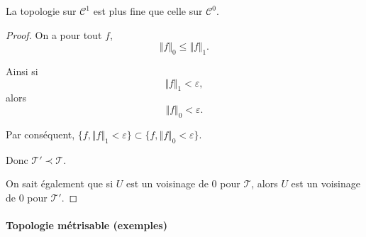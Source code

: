 \documentclass[french]{book}
\theoremstyle{definition}
\newcommand{\lesss}{<}
\newcommand{\less}{\lesss}
\begin{document}
La topologie sur $\mathcal{C}^1$ est plus fine que celle sur $\mathcal{C}^0$.

\begin{proof}
  On a pour tout $f$, $$\Vert f \Vert _{0} \leq \Vert f \Vert _{1} .$$

  Ainsi si $$\Vert f \Vert _{1} \less \varepsilon,   $$ alors $$\Vert f \Vert _{0} \less \varepsilon.  $$

  Par conséquent, $\{ f , \Vert f \Vert _{1 } \less \varepsilon  \} \subset \{ f, \Vert f \Vert _{0} \less \varepsilon   \} $.

  Donc $\mathscr{T}' \prec \mathscr{T}  $.

  On sait également que si $U$ est un voisinage de 0 pour $\mathscr{T} $, alors $U$ est un voisinage de 0 pour $\mathscr{T}' $.
\end{proof}

\paragraph{Topologie métrisable (exemples)}
\end{document}
